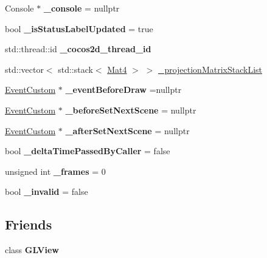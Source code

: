 \begin{DoxyCompactItemize}
Console $\ast$ {\bfseries \+\_\+console} = nullptr
\item 
\mbox{\label{classDirector_a8f1b737bd4b595c048c6a65dcf897b1a}} 
bool {\bfseries \+\_\+is\+Status\+Label\+Updated} = true
\item 
\mbox{\label{classDirector_af68be87346c5abc63155f01914b90d16}} 
std\+::thread\+::id {\bfseries \+\_\+cocos2d\+\_\+thread\+\_\+id}
\item 
std\+::vector$<$ std\+::stack$<$ \hyperlink{classMat4}{Mat4} $>$ $>$ \hyperlink{classDirector_adf0f8f92f046f18003f9d947ea8536d3}{\+\_\+projection\+Matrix\+Stack\+List}
\item 
\mbox{\label{classDirector_a7cca7ddad22e97c7a757998fd4727ea2}} 
\hyperlink{classEventCustom}{Event\+Custom} $\ast$ {\bfseries \+\_\+event\+Before\+Draw} =nullptr
\item 
\mbox{\label{classDirector_a885af88c57487408de8dbb4f31c662cf}} 
\hyperlink{classEventCustom}{Event\+Custom} $\ast$ {\bfseries \+\_\+before\+Set\+Next\+Scene} = nullptr
\item 
\mbox{\label{classDirector_a6a7ff6faee8faaa1424a9a8c8bbe4f7f}} 
\hyperlink{classEventCustom}{Event\+Custom} $\ast$ {\bfseries \+\_\+after\+Set\+Next\+Scene} = nullptr
\item 
\mbox{\label{classDirector_a29687ac5fe46df92302c5b22cfb1a0db}} 
bool {\bfseries \+\_\+delta\+Time\+Passed\+By\+Caller} = false
\item 
\mbox{\label{classDirector_a1a73e25afa47a97d2dfcff5a8471e489}} 
unsigned int {\bfseries \+\_\+frames} = 0
\item 
\mbox{\label{classDirector_a25dca830029005490abb4a7ab5e41a1a}} 
bool {\bfseries \+\_\+invalid} = false
\end{DoxyCompactItemize}
\subsection*{Friends}
\begin{DoxyCompactItemize}
\item 
\mbox{\label{classDirector_a09787e486afef1b86760d393631c3fa2}} 
class {\bfseries G\+L\+View}
\end{DoxyCompactItemize}


